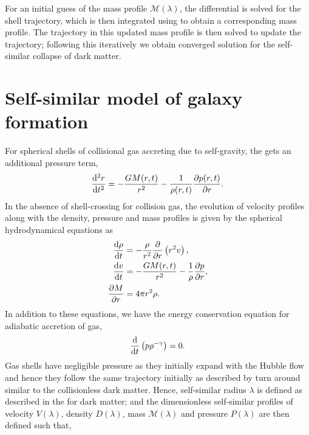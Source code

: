 For an initial guess of the mass profile $\mathcal{M}(\lambda)$, the differential  is solved for the shell trajectory, which is then integrated using  to obtain a corresponding mass profile. The trajectory in this updated mass profile is then solved to update the trajectory; following this iteratively we obtain converged solution for the self-similar collapse of dark matter.


\section{Self-similar model of galaxy formation}
For spherical shells of collisional gas accreting due to self-gravity, the  gets an additional pressure term,
\begin{align}
\label{eq:gas_traj_phys_accl-ch:ssr}
\frac{{\rm d}^2 r}{{\rm d} t^2} = - \frac{GM(r,t)}{r^2} -\frac{1}{\rho(r,t) }\frac{\partial p(r,t)}{\partial r}.
\end{align}
In the absence of shell-crossing for collision gas, the evolution of velocity profiles along with the density, pressure and mass profiles is given by the spherical hydrodynamical equations \cite{1985Bertschinger} as
\begin{align}
\label{eq:sph_hydro_cont-ch:ssr}
\frac{{\rm d}\rho }{{\rm d}t} &= -\frac{\rho }{r^2}\frac{\mathrm{\partial} }{\mathrm{\partial} r} \left( r^2v \right) , \\
\label{eq:sph_hydro_accl-ch:ssr}
\frac{{\rm d}v}{{\rm d}t} &= - \frac{GM(r,t)}{r^2} -\frac{1}{\rho }\frac{\partial p}{\mathrm{\partial} r}, \\
\label{eq:sph_hydro_mass_cons-ch:ssr}
\frac{\mathrm{\partial} M}{\mathrm{\partial} r} &= 4\pi r^2 \rho.
\end{align}
In addition to these equations, we have the energy conservation equation for adiabatic accretion of gas, 
\begin{align}
\label{eq:sph_hydro_adiab-ch:ssr}
\frac{{\rm d}}{{\rm d}t}\left( p \rho ^{-\gamma } \right) = 0.
\end{align}
Gas shells have negligible pressure as they initially expand with the Hubble flow and hence they follow the same trajectory initially as described by  turn around similar to the collisionless dark matter. Hence, self-similar radius $\lambda$ is defined as described in the  for dark matter; and the dimensionless self-similar profiles of velocity $V(\lambda)$, density $D(\lambda)$, mass $\mathcal{M}(\lambda)$ and pressure $P(\lambda)$ are then defined such that,
